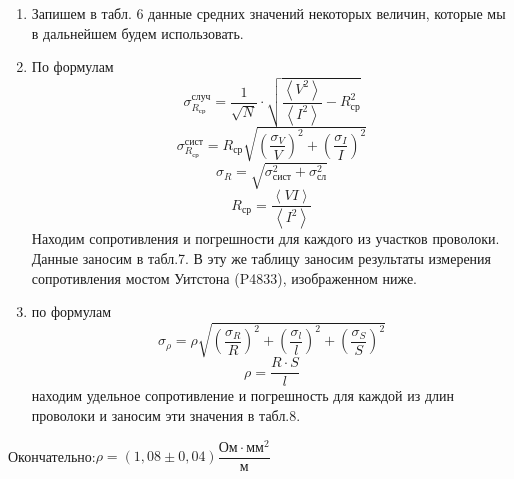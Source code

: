 \documentclass[a4paper, 10pt]{article}%
\begin{document}
\begin{enumerate}
 \\
\item Запишем в табл. 6 данные средних значений некоторых величин, которые мы в дальнейшем будем использовать.
\item По формулам 
\[ \sigma^{\text{случ}}_{R_{\text{ср}}} = \dfrac{1}{\sqrt{N}}\cdot \sqrt{\dfrac{\left\langle V^2 \right\rangle }{\left\langle I^2 \right\rangle} - R^{2}_{\text{ср}}}\] 
\[ \sigma^{\text{сист}}_{R_{\text{ср}}} = R_{\text{ср}}\sqrt{\left( \dfrac{\sigma_{V}}{V} \right) ^{2} + \left( \dfrac{\sigma_{I}}{I} \right) ^{2} } \]
\[ \sigma_R =  \sqrt{\sigma_{\text{сист}}^2 + \sigma_{\text{сл}}^2} \]
\[ R_\text{ср} = \dfrac{\left\langle VI \right\rangle}{\left\langle I^2 \right\rangle}\]
Находим сопротивления и погрешности для каждого из участков проволоки. Данные заносим в табл.7. В эту же таблицу заносим результаты измерения сопротивления мостом Уитстона (P4833), изображенном ниже.
\begin{figure}[h]
\end{figure}
\item по формулам 
\[ \sigma_{\rho} = \rho \sqrt{\left( \dfrac{\sigma_{R}}{R} \right) ^{2} + \left( \dfrac{\sigma_{l}}{l} \right) ^{2} + \left( \dfrac{\sigma_{S}}{S} \right) ^{2} } \]
\[\rho = \dfrac{R \cdot S}{l}\]
находим удельное сопротивление и погрешность для каждой из длин проволоки и заносим эти значения в табл.8.
\end{enumerate}
Окончательно:$\rho = (1,08\pm0,04) \dfrac{\text{Ом} \cdot \text{мм}^2}{\text{м}}$
\end{document}
